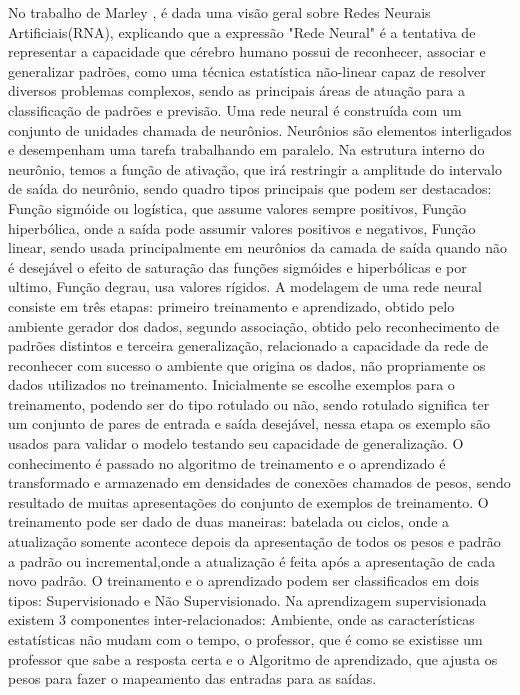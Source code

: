 No trabalho de Marley \cite{Marley}, é dada uma visão geral sobre Redes Neurais Artificiais(RNA), explicando que a expressão "Rede Neural" é a tentativa de representar a capacidade que cérebro humano possui de reconhecer, associar e generalizar padrões, como uma técnica estatística não-linear capaz de resolver diversos problemas complexos, sendo as principais áreas de atuação para a classificação de padrões e previsão. Uma rede neural é construída com um conjunto de unidades chamada de neurônios. Neurônios são elementos interligados e desempenham uma tarefa trabalhando em paralelo. 
Na estrutura interno do neurônio, temos a função de ativação, que irá restringir a amplitude do intervalo de saída do neurônio, sendo quadro tipos principais que podem ser destacados: Função sigmóide ou logística, que assume valores sempre positivos, Função hiperbólica, onde a saída pode assumir valores positivos e negativos, Função linear, sendo usada principalmente em neurônios da camada de saída quando não é desejável o efeito de saturação das funções sigmóides e hiperbólicas e por ultimo, Função degrau, usa valores rígidos. 
A modelagem de uma rede neural consiste em três etapas: primeiro treinamento e aprendizado, obtido pelo ambiente gerador dos dados, segundo associação, obtido pelo reconhecimento de padrões distintos e terceira generalização, relacionado a capacidade da rede de reconhecer com sucesso o ambiente que origina os dados, não propriamente os dados utilizados no treinamento. Inicialmente se escolhe exemplos para o treinamento, podendo ser do tipo rotulado ou não, sendo rotulado significa ter um conjunto de pares de entrada e saída desejável, nessa etapa os exemplo são usados para validar o modelo testando seu capacidade de generalização. 
O conhecimento é passado no algoritmo de treinamento e o aprendizado é transformado e armazenado em densidades de conexões chamados de pesos, sendo resultado de muitas apresentações do conjunto de exemplos de treinamento. O treinamento pode ser dado de duas maneiras: batelada ou ciclos, onde a atualização somente acontece depois da apresentação de todos os pesos e padrão a padrão ou incremental,onde a atualização é feita após a apresentação de cada novo padrão. 
O treinamento e o aprendizado podem ser classificados em dois tipos: Supervisionado e Não Supervisionado. 
Na aprendizagem supervisionada existem 3 componentes inter-relacionados: Ambiente, onde as características estatísticas não mudam com o tempo, o professor, que é como se existisse um professor que sabe a resposta certa e o Algoritmo de aprendizado, que ajusta os pesos para fazer o mapeamento das entradas para as saídas. 
